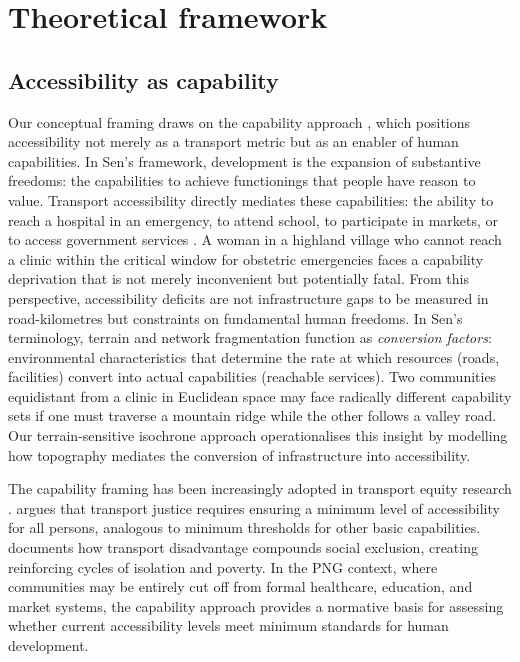 \documentclass[review,3p,authoryear]{elsarticle}
\begin{document}
\section{Theoretical framework}
\label{sec:theory}

\subsection{Accessibility as capability}

Our conceptual framing draws on the capability approach \citep{sen1999}, which positions accessibility not merely as a transport metric but as an enabler of human capabilities. In Sen's framework, development is the expansion of substantive freedoms: the capabilities to achieve functionings that people have reason to value. Transport accessibility directly mediates these capabilities: the ability to reach a hospital in an emergency, to attend school, to participate in markets, or to access government services \citep{pereira2017}. A woman in a highland village who cannot reach a clinic within the critical window for obstetric emergencies faces a capability deprivation that is not merely inconvenient but potentially fatal. From this perspective, accessibility deficits are not infrastructure gaps to be measured in road-kilometres but constraints on fundamental human freedoms. In Sen's terminology, terrain and network fragmentation function as \textit{conversion factors}: environmental characteristics that determine the rate at which resources (roads, facilities) convert into actual capabilities (reachable services). Two communities equidistant from a clinic in Euclidean space may face radically different capability sets if one must traverse a mountain ridge while the other follows a valley road. Our terrain-sensitive isochrone approach operationalises this insight by modelling how topography mediates the conversion of infrastructure into accessibility.

The capability framing has been increasingly adopted in transport equity research \citep{lucas2012, martens2016, pereira2017}. \citet{martens2016} argues that transport justice requires ensuring a minimum level of accessibility for all persons, analogous to minimum thresholds for other basic capabilities. \citet{lucas2012} documents how transport disadvantage compounds social exclusion, creating reinforcing cycles of isolation and poverty. In the PNG context, where communities may be entirely cut off from formal healthcare, education, and market systems, the capability approach provides a normative basis for assessing whether current accessibility levels meet minimum standards for human development.
\end{document}
